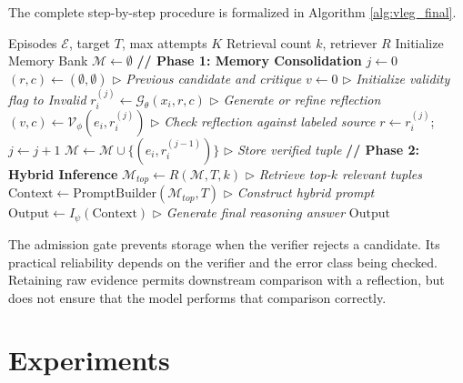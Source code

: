 \documentclass[journal]{IEEEtran}
\theoremstyle{definition}
\theoremstyle{remark}
\begin{document}
The complete step-by-step procedure is formalized in Algorithm \ref{alg:vleg_final}.

\begin{algorithm}[!t]
\caption{Verified Localized Episodic Grounding (VLEG)}
\label{alg:vleg_final}
\small
\begin{algorithmic}[1]
\Require Episodes $\mathcal{E}$, target $T$, max attempts $K$
\Statex Retrieval count $k$, retriever $R$
\State Initialize Memory Bank $\mathcal{M} \gets \emptyset$
\State \textbf{// Phase 1: Memory Consolidation}
    \State $j \gets 0$
    \State $(r,c) \gets (\emptyset,\emptyset)$
        \Statex $\triangleright$ \textit{Previous candidate and critique}
    \State $v \gets 0$
        \Statex $\triangleright$ \textit{Initialize validity flag to Invalid}
        \State $r_i^{(j)} \gets \mathcal{G}_\theta(x_i, r, c)$
        \Statex $\triangleright$ \textit{Generate or refine reflection}
        \State $(v, c) \gets \mathcal{V}_\phi(e_i, r_i^{(j)})$
        \Statex $\triangleright$ \textit{Check reflection against labeled source}
        \State $r \gets r_i^{(j)}$; $j \gets j + 1$
    \EndWhile
        \State $\mathcal{M} \gets \mathcal{M} \cup \{(e_i, r_i^{(j-1)})\}$
        \Statex $\triangleright$ \textit{Store verified tuple}
    \EndIf
\EndFor
\State \textbf{// Phase 2: Hybrid Inference}
\State $\mathcal{M}_{top} \gets R(\mathcal{M}, T, k)$
        \Statex $\triangleright$ \textit{Retrieve top-$k$ relevant tuples}
\State $\text{Context} \gets \text{PromptBuilder}(\mathcal{M}_{top},T)$
        \Statex $\triangleright$ \textit{Construct hybrid prompt}
\State $\text{Output} \gets I_\psi(\text{Context})$
        \Statex $\triangleright$ \textit{Generate final reasoning answer}
\State \Return $\text{Output}$
\end{algorithmic}
\end{algorithm}



The admission gate prevents storage when the verifier rejects a candidate. Its practical reliability depends on the verifier and the error class being checked. Retaining raw evidence permits downstream comparison with a reflection, but does not ensure that the model performs that comparison correctly.


\section{Experiments}
\end{document}
